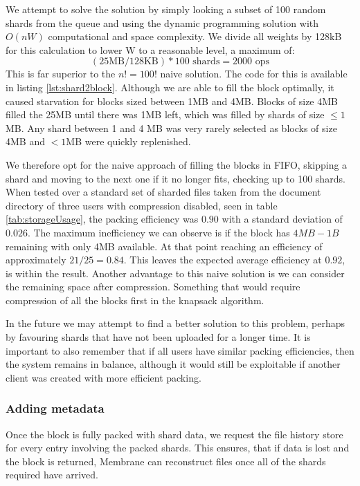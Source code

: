 \documentclass[11pt, a4paper, twocolumn, twoside]{report}
\begin{document}
We attempt to solve the solution by simply looking a subset of 100 random shards from the queue and using the dynamic programming solution with $O(nW)$ computational and space complexity. \citep{martello1999dynamic} We divide all weights by 128kB for this calculation to lower W to a reasonable level, a maximum of: 
$$(25\mbox{MB} / 128\mbox{KB}) * 100  \mbox{ shards} = 2000 \mbox{ ops}$$ 
This is far superior to the $n! = 100!$ naive solution. The code for this is available in listing \ref{lst:shard2block}. Although we are able to fill the block optimally, it caused starvation for blocks sized between 1MB and 4MB. Blocks of size 4MB filled the 25MB until there was 1MB left, which was filled by shards of size $\leq1$MB. Any shard between 1 and 4 MB was very rarely selected as blocks of size 4MB and $<1$MB were quickly replenished.

We therefore opt for the naive approach of filling the blocks in FIFO, skipping a shard and moving to the next one if it no longer fits, checking up to 100 shards. When tested over a standard set of sharded files taken from the document directory of three users with compression disabled, seen in table \ref{tab:storageUsage}, the packing efficiency was $0.90$ with a standard deviation of $0.026$. The maximum inefficiency we can observe is if the block has $4MB - 1B$ remaining with only 4MB available. At that point reaching an efficiency of approximately $21/25 = 0.84$. This leaves the expected average efficiency at $0.92$, is within the result. Another advantage to this naive solution is we can consider the remaining space after compression. Something that would require compression of all the blocks first in the knapsack algorithm.

In the future we may attempt to find a better solution to this problem, perhaps by favouring shards that have not been uploaded for a longer time. It is important to also remember that if all users have similar packing efficiencies, then the system remains in balance, although it would still be exploitable if another client was created with more efficient packing.

\subsubsection{Adding metadata}

Once the block is fully packed with shard data, we request the file history store for every entry involving the packed shards. This ensures, that if data is lost and the block is returned, Membrane can reconstruct files once all of the shards required have arrived.
\end{document}
